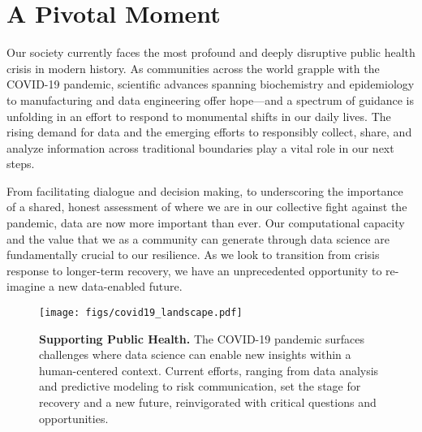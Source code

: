 
\section{A Pivotal Moment}


Our society currently faces the most profound and deeply disruptive public health crisis in modern history. As communities across the world grapple with the COVID-19 pandemic, scientific advances spanning biochemistry and epidemiology to manufacturing and data engineering offer hope—and a spectrum of guidance is unfolding in an effort to respond to monumental shifts in our daily lives. The rising demand for data and the emerging efforts to responsibly collect, share, and analyze information across traditional boundaries play a vital role in our next steps.  

From facilitating dialogue and decision making, to underscoring the importance of a shared, honest assessment of where we are in our collective fight against the pandemic, data are now more important than ever. Our computational capacity and the value that we as a community can generate through data science are fundamentally crucial to our resilience. As we look to transition from crisis response to longer-term recovery, we have an unprecedented opportunity to re-imagine a new data-enabled future.

\begin{figure}
    \centering
    \texttt{[image: figs/covid19\_landscape.pdf]}
    \caption{\textbf{Supporting Public Health.} The COVID-19 pandemic surfaces challenges where data science can enable new insights within a human-centered context. Current efforts, ranging from data analysis and predictive modeling to risk communication, set the stage for recovery and a new future, reinvigorated with critical questions and opportunities.}
\end{figure}
